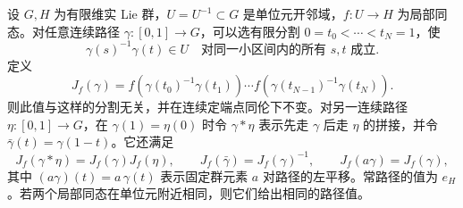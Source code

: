 \begin{lemma}
	\label{g1:lem:local-hom-path-extension}
	设 \(G,H\) 为有限维实 Lie 群，\(U=U^{-1}\subset G\) 是单位元开邻域，\(f:U\to H\) 为局部同态。对任意连续路径 \(\gamma:[0,1]\to G\)，可以选有限分割 \(0=t_0<\cdots<t_N=1\)，使
	\[
		\gamma(s)^{-1}\gamma(t)\in U
		\quad\text{对同一小区间内的所有 }s,t\text{ 成立}.
	\]
	定义
	\begin{equation}
		\label{g1:eq:local-hom-path-product}
		J_f(\gamma)
		=f(\gamma(t_0)^{-1}\gamma(t_1))\cdots
		f(\gamma(t_{N-1})^{-1}\gamma(t_N)).
	\end{equation}
	则此值与这样的分割无关，并在连续定端点同伦下不变。对另一连续路径 \(\eta:[0,1]\to G\)，在 \(\gamma(1)=\eta(0)\) 时令 \(\gamma*\eta\) 表示先走 \(\gamma\) 后走 \(\eta\) 的拼接，并令 \(\bar\gamma(t)=\gamma(1-t)\)。它还满足
	\[
		J_f(\gamma*\eta)=J_f(\gamma)J_f(\eta),\qquad
		J_f(\bar\gamma)=J_f(\gamma)^{-1},\qquad
		J_f(a\gamma)=J_f(\gamma),
	\]
	其中 \((a\gamma)(t)=a\,\gamma(t)\) 表示固定群元素 \(a\) 对路径的左平移。常路径的值为 \(e_H\)。若两个局部同态在单位元附近相同，则它们给出相同的路径值。
\end{lemma}
